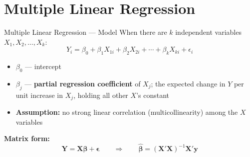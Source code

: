 \documentclass[12pt, aspectratio=169]{beamer}
\begin{document}
    \section{Multiple Linear Regression}

    \begin{frame}{Multiple Linear Regression --- Model}
        When there are $k$ independent variables $X_1, X_2, \ldots, X_k$:
        \[
            Y_i = \beta_0 + \beta_1 X_{1i} + \beta_2 X_{2i}
            + \cdots + \beta_k X_{ki} + \epsilon_i
        \]

        \begin{itemize}
            \item $\beta_0$ --- intercept
            \item $\beta_j$ --- \textbf{partial regression coefficient} of $X_j$; the expected change in $Y$ per unit increase in $X_j$, holding all other $X$'s constant
            \item \textbf{Assumption:} no strong linear correlation (multicollinearity) among the $X$ variables
        \end{itemize}

        \textbf{Matrix form:}
        \[
            \mathbf{Y} = \mathbf{X}\boldsymbol{\beta} + \boldsymbol{\epsilon}
            \qquad \Rightarrow \qquad
            \hat{\boldsymbol{\beta}} = (\mathbf{X}'\mathbf{X})^{-1}\mathbf{X}'\mathbf{y}
        \]
    \end{frame}
\end{document}
